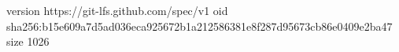 version https://git-lfs.github.com/spec/v1
oid sha256:b15e609a7d5ad036eca925672b1a212586381e8f287d95673cb86e0409e2ba47
size 1026
